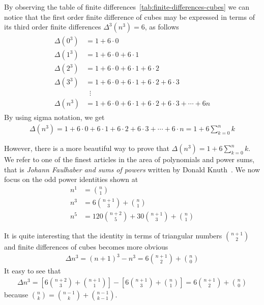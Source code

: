 By observing the table of finite differences~\eqref{tab:finite-differences-cubes} we can notice that
the first order finite difference of cubes may be expressed in terms of its
third order finite differences $\Delta^3(n^3) = 6$, as follows
\begin{align*}
    \begin{split}
        \Delta(0^3) &= 1+6 \cdot 0 \\
        \Delta(1^3) &= 1+6\cdot0+6\cdot1 \\
        \Delta(2^3) &= 1+6\cdot0+6\cdot1+6\cdot2 \\
        \Delta(3^3) &= 1+6\cdot0+6\cdot1+6\cdot2+6\cdot3 \\
        &\; \; \vdots \\
        \Delta(n^3) &= 1+6\cdot0+6\cdot1+6\cdot2+6\cdot3 + \cdots + 6n
    \end{split}
\end{align*}
By using sigma notation, we get
\begin{align*}
    \Delta(n^3) = 1+6\cdot0+6\cdot1+6\cdot2+6\cdot3+\cdots+6\cdot n = 1 + 6 \sum_{k=0}^{n} k
\end{align*}

However, there is a more beautiful way to prove that $\Delta(n^3) = 1 + 6 \sum_{k=0}^{n} k$.
We refer to one of the finest articles in the area of polynomials and power sums,
that is \textit{Johann Faulhaber and sums of powers} written by Donald Knuth~\cite{knuth1993johann}.
We now focus on the odd power identities shown at~\cite[~p. 9]{knuth1993johann}
\begin{align*}
    n^1 &= \binom{n}{1} \\
    n^3 &= 6 \binom{n+1}{3} + \binom{n}{1} \\
    n^5 &= 120 \binom{n+2}{5} + 30 \binom{n+1}{3} + \binom{n}{1}
\end{align*}

It is quite interesting that the identity in terms of triangular numbers $\binom{n+1}{2}$
and finite differences of cubes becomes more obvious
\begin{align*}
    \Delta n^3
    = (n+1)^3 - n^3
    =  6 \binom{n+1}{2} + \binom{n}{0}
\end{align*}
It easy to see that
\begin{align*}
    \Delta n^3
    = \left[ 6 \binom{n+2}{3} + \binom{n+1}{1} \right] - \left[ 6 \binom{n+1}{3} + \binom{n}{1} \right]
    = 6 \binom{n+1}{2} + \binom{n}{0}
\end{align*}
because $\binom{n}{k} = \binom{n-1}{k} + \binom{n-1}{k-1}$.

